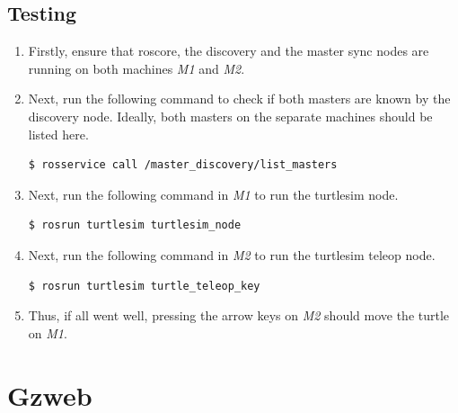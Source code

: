 \documentclass[11pt]{article}
\begin{document}
\subsection{Testing}
\begin{enumerate}
 \item {
       Firstly, ensure that roscore, the discovery and the master sync nodes are running on both machines \emph{M1} and \emph{M2}.
       }
 \item{
       Next, run the following command to check if both masters are known by the discovery node.
       Ideally, both masters on the separate machines should be listed here.
       \begin{lstlisting}[language=bash]
         $ rosservice call /master_discovery/list_masters
        \end{lstlisting}
       }
 \item{
       Next, run the following command in \emph{M1} to run the turtlesim node.
       \begin{lstlisting}[language=bash]
          $ rosrun turtlesim turtlesim_node
        \end{lstlisting}
       }
 \item{
       Next, run the following command in \emph{M2} to run the turtlesim teleop node.
       \begin{lstlisting}[language=bash]
          $ rosrun turtlesim turtle_teleop_key
        \end{lstlisting}
       }
 \item{
       Thus, if all went well, pressing the arrow keys on \emph{M2} should move the turtle on \emph{M1}.
       }
\end{enumerate}
\section{Gzweb}
\end{document}
